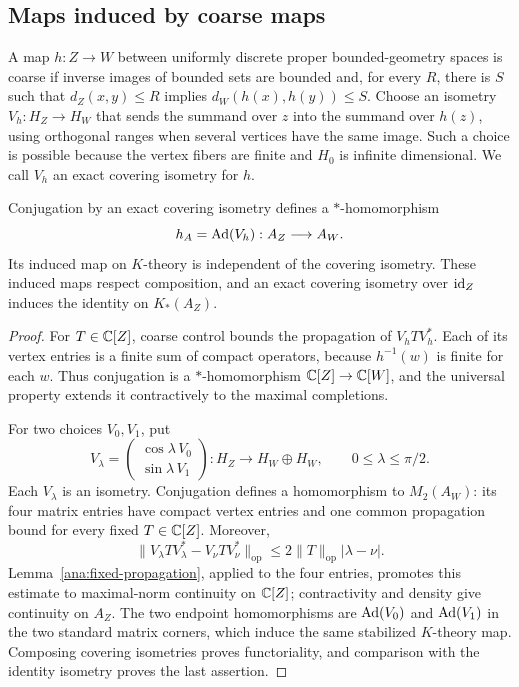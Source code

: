 \subsection{Maps induced by coarse maps}

A map $h:Z\to W$ between uniformly discrete proper bounded-geometry spaces
is coarse if inverse images of bounded sets are bounded and, for every
$R$, there is $S$ such that $d_Z(x,y)\leq R$ implies
$d_W(h(x),h(y))\leq S$.  Choose an isometry
$V_h:H_Z\to H_W$ that sends the summand over $z$ into the summand over
$h(z)$, using orthogonal ranges when several vertices have the same image.
Such a choice is possible because the vertex fibers are finite and $H_0$
is infinite dimensional.  We call $V_h$ an exact covering isometry for $h$.

\begin{proposition}
\label{ana:functoriality}
Conjugation by an exact covering isometry defines a $*$-homomorphism
\[
 h_A=\operatorname{Ad}(V_h):A_Z\longrightarrow A_W.
\]
Its induced map on $K$-theory is independent of the covering isometry.
These induced maps respect composition, and an exact covering isometry
over $\operatorname{id}_Z$ induces the identity on $K_*(A_Z)$.
\end{proposition}

\begin{proof}
For $T\in\mathbb C[Z]$, coarse control bounds the propagation of $V_hTV_h^*$.
Each of its vertex entries is a finite sum of compact operators, because
$h^{-1}(w)$ is finite for each $w$.  Thus conjugation is a $*$-homomorphism
$\mathbb C[Z]\to\mathbb C[W]$, and the universal property extends it contractively to
the maximal completions.

For two choices $V_0,V_1$, put
\[
 V_\lambda=
 \begin{pmatrix}\cos\lambda\,V_0\\ \sin\lambda\,V_1\end{pmatrix}
 :H_Z\longrightarrow H_W\oplus H_W,
 \qquad 0\leq\lambda\leq\pi/2.
\]
Each $V_\lambda$ is an isometry.  Conjugation defines a homomorphism to
$M_2(A_W)$: its four matrix entries have compact vertex entries and one
common propagation bound for every fixed $T\in\mathbb C[Z]$.  Moreover,
\[
 \|V_\lambda T V_\lambda^*-V_\nu T V_\nu^*\|_{\mathrm{op}}
 \leq 2\|T\|_{\mathrm{op}}|\lambda-\nu|.
\]
Lemma~\ref{ana:fixed-propagation}, applied to the four entries, promotes
this estimate to maximal-norm continuity on $\mathbb C[Z]$; contractivity and
density give continuity on $A_Z$.  The two endpoint homomorphisms are
$\operatorname{Ad}(V_0)$ and $\operatorname{Ad}(V_1)$ in the two standard matrix corners, which induce
the same stabilized $K$-theory map.  Composing covering isometries proves
functoriality, and comparison with the identity isometry proves the last
assertion.
\end{proof}

